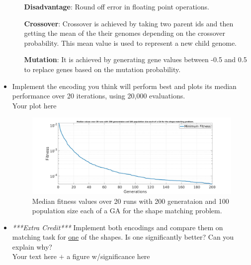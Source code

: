 \documentclass{article}
\begin{document}
\begin{itemize}
\begin{enumerate}
		\textbf{Disadvantage}: Round off error in floating point operations.
		
		 
		\textbf{Crossover}: Crossover is achieved by taking two parent ids and then getting the mean of the their genomes depending on the crossover probability. This mean value is used to represent a new child genome.  
		
		\textbf{Mutation}: It is achieved by generating gene values between -0.5 and 0.5 to replace genes based on the mutation probability.
		
		
		\color{black}
	\end{enumerate}
	\item Implement the encoding you think will perform best and plots its median performance over 20 iterations, using 20,000 evaluations.
	\\\color{red}Your plot here\color{black}
			\begin{figure}[H]
				\centering
				\includegraphics[width=1.0\textwidth]{img/ga20-2000.jpg}
				\caption{Median fitness values over 20 runs with 200 generataion and 100 population size each of a GA for the shape matching problem.}
			\end{figure}

	\item \textit{***Extra Credit***} Implement both encodings and compare them on matching task for \underline{one} of the shapes. Is one significantly better? Can you explain why?
	\\\color{red}Your text here $+$ a figure w/significance here\color{black}
\end{itemize}

\newpage
\end{document}
